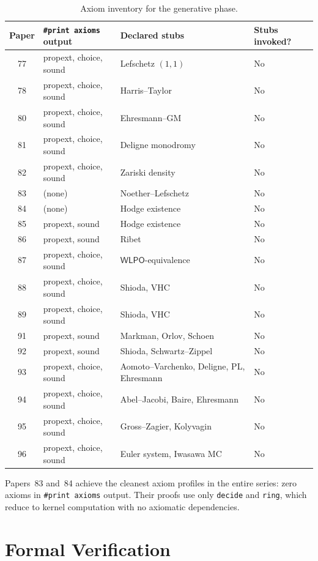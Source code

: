 \documentclass[11pt]{article}
\theoremstyle{plain}
\theoremstyle{definition}
\theoremstyle{remark}
\newcommand{\WLPO}{\mathsf{WLPO}}
\begin{document}
\begin{table}[ht]
\centering
\small
\caption{Axiom inventory for the generative phase.}\label{tab:axiom-inventory}
\begin{tabular}{@{}clll@{}}
\toprule
Paper & \texttt{\#print axioms} output & Declared stubs & Stubs invoked? \\
\midrule
77 & propext, choice, sound & Lefschetz $(1,1)$ & No \\
78 & propext, choice, sound & Harris--Taylor & No \\
80 & propext, choice, sound & Ehresmann--GM & No \\
81 & propext, choice, sound & Deligne monodromy & No \\
82 & propext, choice, sound & Zariski density & No \\
83 & (none) & Noether--Lefschetz & No \\
84 & (none) & Hodge existence & No \\
85 & propext, sound & Hodge existence & No \\
86 & propext, sound & Ribet & No \\
87 & propext, choice, sound & $\WLPO$-equivalence & No \\
88 & propext, choice, sound & Shioda, VHC & No \\
89 & propext, choice, sound & Shioda, VHC & No \\
91 & propext, sound & Markman, Orlov, Schoen & No \\
92 & propext, sound & Shioda, Schwartz--Zippel & No \\
93 & propext, choice, sound & Aomoto--Varchenko, Deligne, PL, Ehresmann & No \\
94 & propext, choice, sound & Abel--Jacobi, Baire, Ehresmann & No \\
95 & propext, choice, sound & Gross--Zagier, Kolyvagin & No \\
96 & propext, choice, sound & Euler system, Iwasawa MC & No \\
\bottomrule
\end{tabular}
\end{table}

Papers~83 and~84 achieve the cleanest axiom profiles in the entire
series: zero axioms in \texttt{\#print axioms} output.  Their proofs
use only \texttt{decide} and \texttt{ring}, which reduce to kernel
computation with no axiomatic dependencies.


\section{Formal Verification}\label{sec:verification}
\end{document}

